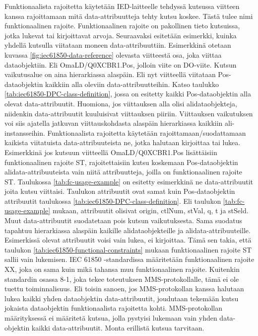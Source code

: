 Funktionaalista rajoitetta käytetään IED-laitteelle tehdyssä kutsussa viitteen kanssa rajoittamaan mitä data-attribuutteja tehty kutsu koskee. Tästä tulee nimi funktionaalinen rajoite. Funktionaalinen rajoite on pakollinen tieto kutsuissa, jotka lukevat tai kirjoittavat arvoja. Seuraavaksi esitetään esimerkki, kuinka yhdellä kutsulla viitataan moneen data-attribuuttiin. Esimerkkinä otetaan kuvassa \ref{fig:iec61850-data-reference} olevasta viitteestä osa, joka viittaa dataobjektiin. Eli OmaLD/Q0XCBR1.Pos, jolloin viite on DO-viite. Kutsun vaikutusalue on aina hierarkiassa alaspäin. Eli nyt viitteellä viitataan Pos-dataobjektin kaikkiin alla oleviin data-attribuutteihin. Katso taulukko \ref{tab:iec61850-DPC-class-definition}, jossa on esitetty kaikki Pos-dataobjektin alla olevat data-attribuutit. Huomiona, jos viittauksen alla olisi alidataobjekteja, niidenkin data-attribuutit kuuluisivat viittauksen piiriin. Viittauksen vaikutuksen voi siis ajatella jatkuvan viittauskohdasta alaspäin hierarkiassa kaikkiin ali-instansseihin. Funktionaalista rajoitetta käytetään rajoittamaan/suodattamaan kaikista viitatuista data-attribuuteista ne, jotka halutaan kirjoittaa tai lukea. Esimerkkinä jos kutsuun viitteellä OmaLD/Q0XCBR1.Pos lisättäisiin funktionaalinen rajoite ST, rajoitettaisiin kutsu koskemaan Pos-dataobjektin alidata-attribuuteista vain niitä attribuutteja, joilla on funktionaalinen rajoite ST. Taulukossa \ref{tab:fc-usage-example} on esitetty esimerkkinä ne data-attribuutit joita kutsu viittaisi. Taulukon attribuutit ovat samat kuin Pos-dataobjektin attribuutit taulukossa \ref{tab:iec61850-DPC-class-definition}. Eli taulukon \ref{tab:fc-usage-example} mukaan, attribuutit olisivat origin, ctlNum, stVal, q, t ja stSeld. Muut data-attribuutit suodatetaan pois kutsun vaikutuksesta. Sama suodatus tapahtuu hierarkiassa alaspäin kaikille alidataobjekteille ja alidata-attribuuteille. Esimerkissä olevat attribuutit voisi vain lukea, ei kirjoittaa. Tämä sen takia, että taulukon \ref{tab:iec61850-functional-constraints} mukaan funktionaalinen rajoite ST sallii vain lukemisen. IEC 61850 -standardissa määritetään funktionaalinen rajoite XX, joka on sama kuin mikä tahansa muu funktionaalinen rajoite. Kuitenkin standardin osassa 8-1, joka tekee toteutuksen MMS-protokollalle, tämä ei ole tuettu toiminnalisuus. Eli toisin sanoen, jos MMS-protokollan kanssa halutaan lukea kaikki yhden dataobjektin data-attribuutit, joudutaan tekemään kutsu jokaista dataobjektin funktionaalista rajoitetta kohti. MMS-protokollan määrityksessä ei määritetä kutsua, jolla pystyisi lukemaan vain yhden data-objektin kaikki data-attribuutit. Monta erillistä kutsua tarvitaan. \mbox{\cite{IEC61850-7-2}}

